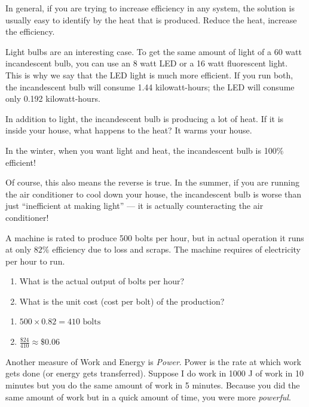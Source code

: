 In general, if you are trying to increase efficiency in any system, the solution 
is usually easy to identify by the heat that is produced. Reduce the heat, increase 
the efficiency.

Light bulbs are an interesting case. To get the same amount of light of a 60 watt 
incandescent bulb, you can use an 8 watt LED or a 16 watt fluorescent light. This 
is why we say that the LED light is much more efficient. If you run both, the 
incandescent bulb will consume 1.44 kilowatt-hours; the LED will consume only 
0.192 kilowatt-hours. 

In addition to light, the incandescent bulb is producing a lot of heat. If it
is inside your house, what happens to the heat? It warms your house.

In the winter, when you want light and heat, the incandescent bulb is
100\% efficient!

Of course, this also means the reverse is true. In the summer, if you are running 
the air conditioner to cool down your house, the incandescent bulb is worse than 
just ``inefficient at making light'' --- it is actually counteracting the air 
conditioner!

\begin{Exercise}[title=Unit Costs, label=efficiency1]
A machine is rated to produce 500 bolts per hour, but in actual operation it runs at only $82\%$ efficiency due to loss and scraps.
The machine requires  of electricity per hour to run.
\begin{enumerate}[label=(\alph*)]
  \item What is the actual output of bolts per hour?
  \item What is the unit cost (cost per bolt) of the production?
\end{enumerate}

\end{Exercise}
\begin{Answer}[ref=efficiency1]
  \begin{enumerate}[label=(\alph*)]
    \item $500 \times 0.82 = 410 \text{ bolts}$
    \item $\frac{\mathdollar24}{410} \approx \mathdollar 0.06$
  \end{enumerate}
\end{Answer}

Another measure of Work and Energy is \emph{Power}. Power is the rate at which work gets done (or energy gets transferred). Suppose I do work in 1000 J of work in 10 minutes but you do the same amount of work in 5 minutes. Because you did the same amount of work but in a quick amount of time, you were more \emph{powerful}.

